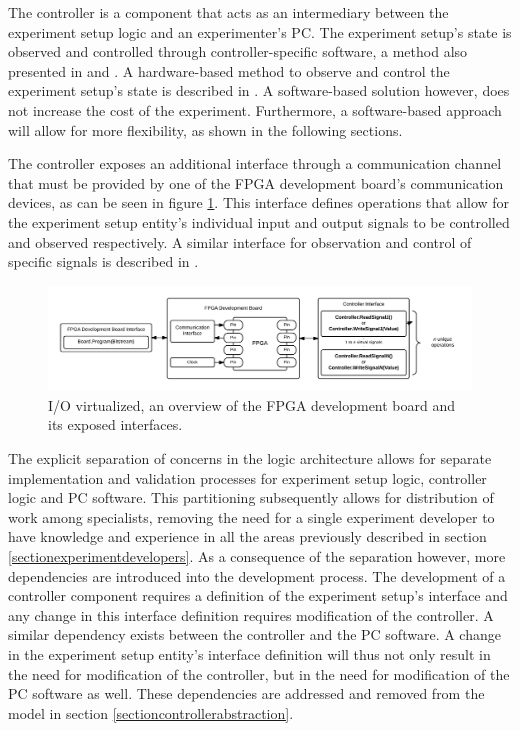 \documentclass[openright]{template/uva-bachelor-thesis}
\begin{document}
The controller is a component that acts as an intermediary between the experiment setup logic and an experimenter's PC. The experiment setup's state is observed and controlled through controller-specific software, a method also presented in \cite{holland2003harnessing} and \cite{bulic2013fpga}. A hardware-based method to observe and control the experiment setup's state is described in \cite{al2007teaching}. A software-based solution however, does not increase the cost of the experiment. Furthermore, a software-based approach will allow for more flexibility, as shown in the following sections. 

The controller exposes an additional interface through a communication channel that must be provided by one of the FPGA development board's communication devices, as can be seen in figure \ref{fig:overview-inout}. This interface defines operations that allow for the experiment setup entity's individual input and output signals to be controlled and observed respectively. A similar interface for observation and control of specific signals is described in \cite{holland2003harnessing}. 

\begin{figure}[h]
\centering
\includegraphics[width=\textwidth]{img/overview-inout}
\caption{I/O virtualized, an overview of the FPGA development board and its exposed interfaces.}
\label{fig:overview-inout}
\end{figure}

The explicit separation of concerns in the logic architecture allows for separate implementation and validation processes for experiment setup logic, controller logic and PC software. This partitioning subsequently allows for distribution of work among specialists, removing the need for a single experiment developer to have knowledge and experience in all the areas previously described in section  \ref{sectionexperimentdevelopers}. As a consequence of the separation however, more dependencies are introduced into the development process. The development of a controller component requires a definition of the experiment setup's interface and any change in this interface definition requires modification of the controller. A similar dependency exists between the controller and the PC software. A change in the experiment setup entity's interface definition will thus not only result in the need for modification of the controller, but in the need for modification of the PC software as well. These dependencies are addressed and removed from the model in section \ref{sectioncontrollerabstraction}.
\end{document}
